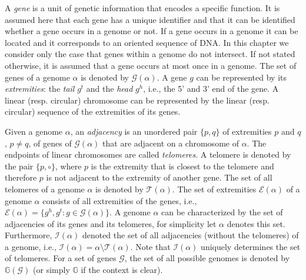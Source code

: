 \documentclass{svmult}
\begin{document}
A \emph{gene} is a unit of genetic information that encodes a specific function. It is assumed here that each
gene has a unique identifier and that it can be identified whether a gene occurs in a 
genome or not. If a gene occurs in a genome it can be located and it corresponds to an 
oriented sequence of DNA. In this chapter we consider
only the case that genes within a genome do not intersect. If not stated otherwise, it is assumed that a gene 
occurs at most once in a genome. The set of genes of a genome $\alpha$ is denoted by $\mathcal{G}(\alpha)$.
A gene $g$ can be represented by its \emph{extremities}: the \emph{tail}
$g^t$ and the \emph{head} $g^h$, i.e., the 5' and 3' end of the gene. A linear (resp. circular) 
chromosome can be represented by the linear (resp. circular) sequence of the extremities of its genes. 
%

Given a genome $\alpha$, an \emph{adjacency} is an unordered pair $\{p,q\}$ of
extremities $p$ and $q$, $p\neq q$, of genes of $\mathcal{G}(\alpha)$ that are
adjacent on a chromosome of $\alpha$. The endpoints of linear
chromosomes are called \emph{telomeres}.
A telomere is denoted by the pair $\{p,\circ\}$, where $p$ is the
extremity that is closest to the telomere and therefore $p$ is not adjacent to the extremity of another gene.
The set of all telomeres of a genome $\alpha$ is denoted by
$\mathcal{T}(\alpha)$.
The set of extremities $\mathcal{E}(\alpha)$ of a genome $\alpha$ consists of
all extremities of the genes, i.e., $\mathcal{E}(\alpha)= \{
g^h,g^t: g \in \mathcal{G}(\alpha)\}$.
A genome $\alpha$ can be characterized by the set of adjacencies of its genes 
and its telomeres, for simplicity let $\alpha$ denotes this set.
%
Furthermore, $\mathcal{I}(\alpha)$ denoted the set of all adjacencies (without
the telomeres) of a genome, i.e.,
$\mathcal{I}(\alpha)=\alpha\setminus\mathcal{T}(\alpha)$.
Note that $\mathcal{I}(\alpha)$ uniquely determines the set of telomeres.
%
For a set of genes $\mathcal{G}$, the set of all possible genomes is denoted by $\mathbb{G}(\mathcal{G})$ (or simply 
$\mathbb{G}$ if the context is clear). 
%
\end{document}

